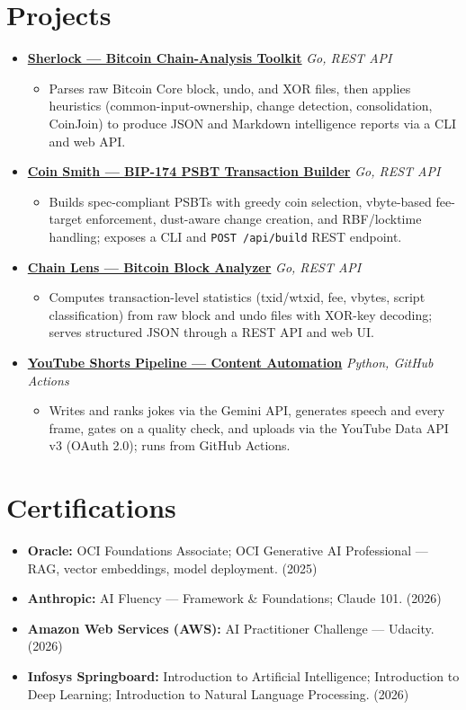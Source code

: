 \documentclass[letterpaper,10.5pt]{article}
\newcommand{\resumeItem}[1]{
  \item\small{#1}
}
\newcommand{\resumeProject}[2]{
  \item[]
    \textbf{#1} \hfill \small\textit{#2}
}
\begin{document}
\section{Projects}
\begin{itemize}
  \resumeProject{\href{https://github.com/itssaharsh/sherlock}{Sherlock --- Bitcoin Chain-Analysis Toolkit}}{Go, REST API}
  \begin{itemize}
    \resumeItem{Parses raw Bitcoin Core block, undo, and XOR files, then applies heuristics (common-input-ownership, change detection, consolidation, CoinJoin) to produce JSON and Markdown intelligence reports via a CLI and web API.}
  \end{itemize}
  \resumeProject{\href{https://github.com/itssaharsh/coin-smith}{Coin Smith --- BIP-174 PSBT Transaction Builder}}{Go, REST API}
  \begin{itemize}
    \resumeItem{Builds spec-compliant PSBTs with greedy coin selection, vbyte-based fee-target enforcement, dust-aware change creation, and RBF/locktime handling; exposes a CLI and \texttt{POST /api/build} REST endpoint.}
  \end{itemize}
  \resumeProject{\href{https://github.com/itssaharsh/Chain-lens}{Chain Lens --- Bitcoin Block Analyzer}}{Go, REST API}
  \begin{itemize}
    \resumeItem{Computes transaction-level statistics (txid/wtxid, fee, vbytes, script classification) from raw block and undo files with XOR-key decoding; serves structured JSON through a REST API and web UI.}
  \end{itemize}
  \resumeProject{\href{https://github.com/itssaharsh/ed}{YouTube Shorts Pipeline --- Content Automation}}{Python, GitHub Actions}
  \begin{itemize}
    \resumeItem{Writes and ranks jokes via the Gemini API, generates speech and every frame, gates on a quality check, and uploads via the YouTube Data API v3 (OAuth 2.0); runs from GitHub Actions.}
  \end{itemize}
\end{itemize}

\section{Certifications}
\begin{itemize}
  \resumeItem{\textbf{Oracle:} OCI Foundations Associate; OCI Generative AI Professional --- RAG, vector embeddings, model deployment. (2025)}
  \resumeItem{\textbf{Anthropic:} AI Fluency --- Framework \& Foundations; Claude 101. (2026)}
  \resumeItem{\textbf{Amazon Web Services (AWS):} AI Practitioner Challenge --- Udacity. (2026)}
  \resumeItem{\textbf{Infosys Springboard:} Introduction to Artificial Intelligence; Introduction to Deep Learning; Introduction to Natural Language Processing. (2026)}
\end{itemize}
\end{document}
